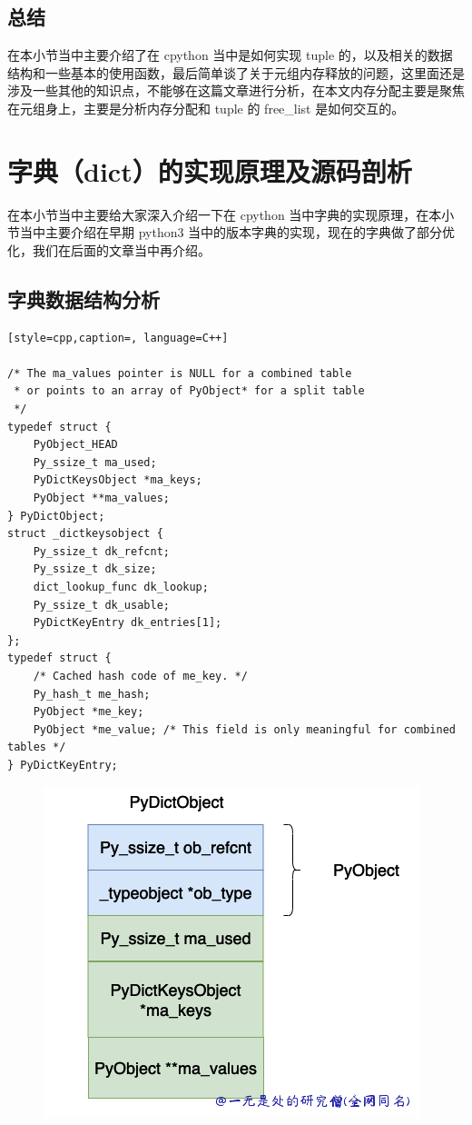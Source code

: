 \subsection{总结}
在本小节当中主要介绍了在 cpython 当中是如何实现 tuple 的，以及相关的数据结构和一些基本的使用函数，最后简单谈了关于元组内存释放的问题，这里面还是涉及一些其他的知识点，不能够在这篇文章进行分析，在本文内存分配主要是聚焦在元组身上，主要是分析内存分配和 tuple 的 free\_list 是如何交互的。


\section{字典（dict）的实现原理及源码剖析}
在本小节当中主要给大家深入介绍一下在 cpython 当中字典的实现原理，在本小节当中主要介绍在早期 python3 当中的版本字典的实现，现在的字典做了部分优化，我们在后面的文章当中再介绍。
\subsection{字典数据结构分析}
\begin{lstlisting}[style=cpp,caption=, language=C++]

/* The ma_values pointer is NULL for a combined table
 * or points to an array of PyObject* for a split table
 */
typedef struct {
    PyObject_HEAD
    Py_ssize_t ma_used;
    PyDictKeysObject *ma_keys;
    PyObject **ma_values;
} PyDictObject;
struct _dictkeysobject {
    Py_ssize_t dk_refcnt;
    Py_ssize_t dk_size;
    dict_lookup_func dk_lookup;
    Py_ssize_t dk_usable;
    PyDictKeyEntry dk_entries[1];
};
typedef struct {
    /* Cached hash code of me_key. */
    Py_hash_t me_hash;
    PyObject *me_key;
    PyObject *me_value; /* This field is only meaningful for combined tables */
} PyDictKeyEntry;
\end{lstlisting}

    \begin{figure}[h]
        \centering
            \includegraphics[scale=.3]{images/26-dict.png}
            \caption{ }
        \label{fig:my_label}
    \end{figure}
    
